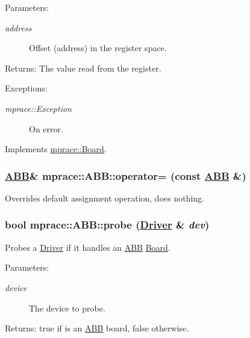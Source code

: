 \begin{Desc}
\item[Parameters:]
\begin{description}
\item[{\em address}]Offset (address) in the register space. \end{description}
\end{Desc}
\begin{Desc}
\item[Returns:]The value read from the register. \end{Desc}
\begin{Desc}
\item[Exceptions:]
\begin{description}
\item[{\em mprace::Exception}]On error.\end{description}
\end{Desc}


Implements \hyperlink{classmprace_1_1Board_a2}{mprace::Board}.\hypertarget{classmprace_1_1ABB_b1}{
\subsubsection[operator=]{\setlength{\rightskip}{0pt plus 5cm}\hyperlink{classmprace_1_1ABB}{ABB}\& mprace::ABB::operator= (const \hyperlink{classmprace_1_1ABB}{ABB} \&)}}
\label{classmprace_1_1ABB_b1}


Overrides default assignment operation, does nothing. 

\hypertarget{classmprace_1_1ABB_e0}{
\subsubsection[probe]{\setlength{\rightskip}{0pt plus 5cm}bool mprace::ABB::probe (\hyperlink{classmprace_1_1Driver}{Driver} \& {\em dev})}}
\label{classmprace_1_1ABB_e0}


Probes a \hyperlink{classmprace_1_1Driver}{Driver} if it handles an \hyperlink{classmprace_1_1ABB}{ABB} \hyperlink{classmprace_1_1Board}{Board}. 

\begin{Desc}
\item[Parameters:]
\begin{description}
\item[{\em device}]The device to probe. \end{description}
\end{Desc}
\begin{Desc}
\item[Returns:]true if is an \hyperlink{classmprace_1_1ABB}{ABB} board, false otherwise.\end{Desc}


